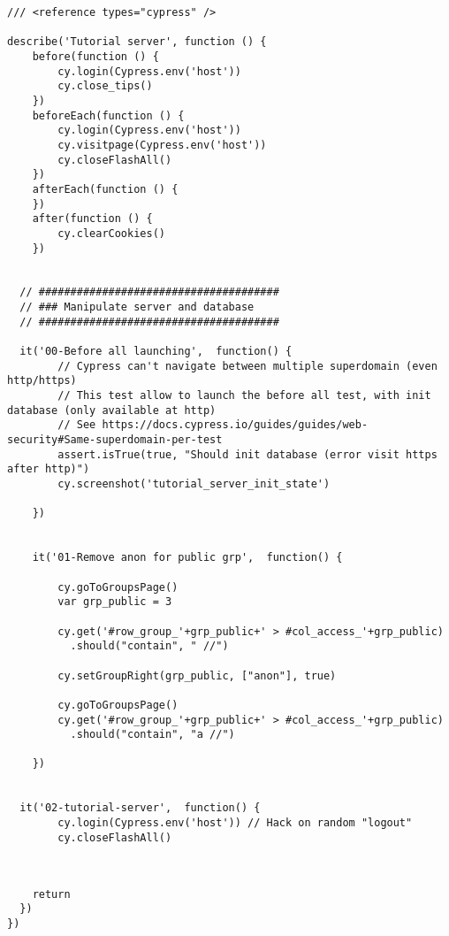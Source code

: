 
\begin{verbatim}
/// <reference types="cypress" />

describe('Tutorial server', function () {
    before(function () {
        cy.login(Cypress.env('host'))
        cy.close_tips()
    })
    beforeEach(function () {
        cy.login(Cypress.env('host'))
        cy.visitpage(Cypress.env('host'))
        cy.closeFlashAll()
    })
    afterEach(function () {
    })
    after(function () {
        cy.clearCookies()
    })


  // ######################################
  // ### Manipulate server and database
  // ######################################

  it('00-Before all launching',  function() {
        // Cypress can't navigate between multiple superdomain (even http/https)
        // This test allow to launch the before all test, with init database (only available at http)
        // See https://docs.cypress.io/guides/guides/web-security#Same-superdomain-per-test
        assert.isTrue(true, "Should init database (error visit https after http)")
        cy.screenshot('tutorial_server_init_state')

    })


    it('01-Remove anon for public grp',  function() {

        cy.goToGroupsPage()
        var grp_public = 3

        cy.get('#row_group_'+grp_public+' > #col_access_'+grp_public)
          .should("contain", " //")

        cy.setGroupRight(grp_public, ["anon"], true)

        cy.goToGroupsPage()
        cy.get('#row_group_'+grp_public+' > #col_access_'+grp_public)
          .should("contain", "a //")

    })


  it('02-tutorial-server',  function() {
        cy.login(Cypress.env('host')) // Hack on random "logout"
        cy.closeFlashAll()



\end{verbatim}



\begin{verbatim}
    return
  })
})

\end{verbatim}
